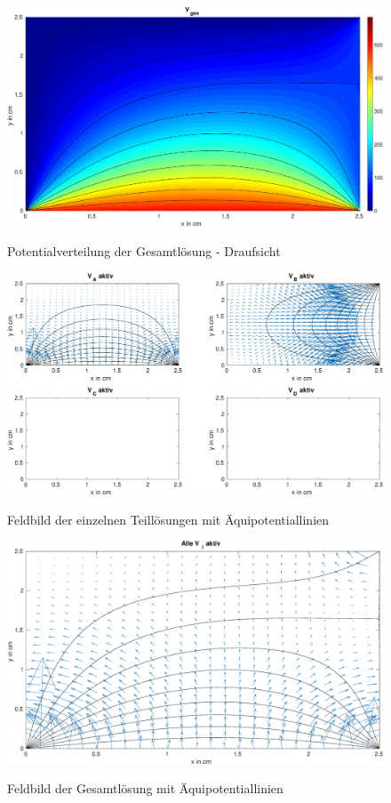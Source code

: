 \begin{figure}[H]
  \centering
  		\includegraphics[width=1.0\textwidth]{pics/Bsp_1_analytical_figures/TaskB_fig_4.eps}
  \label{fig:Ana:TaskB:CompleteRot}
  \caption{Potentialverteilung der Gesamtlösung - Draufsicht}
\end{figure}

\begin{figure}[H]
  \centering
  		\includegraphics[width=1.0\textwidth]{pics/Bsp_1_analytical_figures/TaskB_fig_5.eps}
  \label{fig:Ana:TaskB:Field:Individual}
  \caption{Feldbild der einzelnen Teillösungen mit Äquipotentiallinien}
\end{figure}

\begin{figure}[H]
  \centering
  		\includegraphics[width=1.0\textwidth]{pics/Bsp_1_analytical_figures/TaskB_fig_6.eps}
  \label{fig:Ana:TaskB:Field:Complete}
  \caption{Feldbild der Gesamtlösung mit Äquipotentiallinien}
\end{figure}



